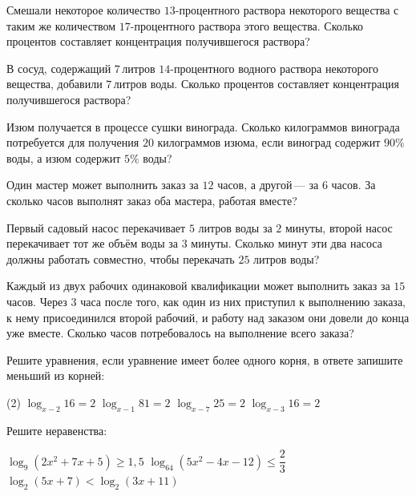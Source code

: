 \begin{class}[number=5]
\begin{listofex}
		\item Смешали некоторое количество \(13\)-процентного раствора некоторого вещества с таким же количеством \(17\)-процентного раствора этого вещества. Сколько процентов составляет концентрация получившегося раствора?
		\item В сосуд, содержащий \(7\) литров \(14\)-процентного водного раствора некоторого вещества, добавили \(7\) литров воды. Сколько процентов составляет концентрация получившегося раствора?
		\item Изюм получается в процессе сушки винограда. Сколько килограммов винограда потребуется для получения \(20\) килограммов изюма, если виноград содержит \(90\%\) воды, а изюм содержит \(5\%\) воды?
		
		\item Один мастер может выполнить заказ за \(12\) часов, а другой --- за \(6\) часов. За сколько часов выполнят заказ оба мастера, работая вместе?
		\item Первый садовый насос перекачивает \(5\) литров воды за \(2\) минуты, второй насос перекачивает тот же объём воды за \(3\) минуты. Сколько минут эти два насоса должны работать совместно, чтобы перекачать \(25\) литров воды?
		\item Каждый из двух рабочих одинаковой квалификации может выполнить заказ за \(15\) часов. Через \(3\) часа после того, как один из них приступил к выполнению заказа, к нему присоединился второй рабочий, и работу над заказом они довели до конца уже вместе. Сколько часов потребовалось на выполнение всего заказа?
		
		\item Решите уравнения, если уравнение имеет более одного корня, в ответе запишите меньший из корней:
		\begin{tasks}(2)
			\task \( \log_{x-2}16=2 \)
			\task \( \log_{x-1}81=2 \)
			\task \( \log_{x-7}25=2 \)
			\task \( \log_{x-3}16=2 \)
		\end{tasks}
		
		\item Решите неравенства: %
		\begin{tasks}
			\task \( \log_9(2x^2+7x+5)\ge 1,5 \)
			\task \( \log_{64}(5x^2-4x-12) \le \dfrac{ 2 }{ 3 } \)
			\task \( \log_2(5x+7) < \log_2 (3x+11) \)
		\end{tasks}
	\end{listofex}
\end{class}

